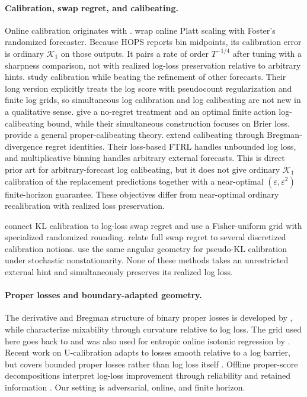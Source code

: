 \documentclass{article}
\newcommand{\calK}{\mathcal{K}}
\begin{document}
\paragraph{Calibration, swap regret, and calibeating.}
Online calibration originates with \citet{foster1998asymptotic}. \citet{gupta2023online} wrap online Platt scaling with Foster's randomized forecaster. Because HOPS reports bin midpoints, its calibration error is ordinary $\calK_1$ on those outputs. It pairs a rate of order $T^{-1/4}$ after tuning with a sharpness comparison, not with realized log-loss preservation relative to arbitrary hints. \citet{foster2023calibeating} study calibration while beating the refinement of other forecasts. Their long version explicitly treats the log score with pseudocount regularization and finite log grids, so simultaneous log calibration and log calibeating are not new in a qualitative sense. \citet{chen2026calibeating} give a no-regret treatment and an optimal finite action log-calibeating bound, while their simultaneous construction focuses on Brier loss. \citet{foster2026proper} provide a general proper-calibeating theory. \citet{fichtl2026bregman} extend calibeating through Bregman-divergence regret identities. Their loss-based FTRL handles unbounded log loss, and multiplicative binning handles arbitrary external forecasts. This is direct prior art for arbitrary-forecast log calibeating, but it does not give ordinary $\calK_1$ calibration of the replacement predictions together with a near-optimal $(\varepsilon,\varepsilon^2)$ finite-horizon guarantee. These objectives differ from near-optimal ordinary recalibration with realized loss preservation.

\citet{luo2025kl} connect KL calibration to log-loss swap regret and use a Fisher-uniform grid with specialized randomized rounding. \citet{fishelson2025full} relate full swap regret to several discretized calibration notions. \citet{liu2026adaptive} use the same angular geometry for pseudo-KL calibration under stochastic nonstationarity. None of these methods takes an unrestricted external hint and simultaneously preserves its realized log loss.

\paragraph{Proper losses and boundary-adapted geometry.}
The derivative and Bregman structure of binary proper losses is developed by \citet{reid2010composite}, while \citet{vanerven2012mixability} characterize mixability through curvature relative to log loss. The grid used here goes back to \citet{derooij2009switching} and was also used for entropic online isotonic regression by \citet{kotlowski2016isotonic}. Recent work on U-calibration adapts to losses smooth relative to a log barrier, but covers bounded proper losses rather than log loss itself \citep{frongillo2026ucalibration}. Offline proper-score decompositions interpret log-loss improvement through reliability and retained information \citep{charpentier2026decomposing}. Our setting is adversarial, online, and finite horizon.
\end{document}
